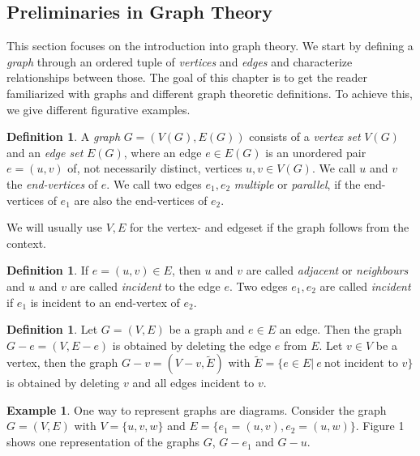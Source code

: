 \documentclass[12pt,a4paper, twoside, autooneside=false]{scrartcl}
\theoremstyle{definition}
\newtheorem{definition}[theorem]{Definition}
\newtheorem{beispiel}[theorem]{Example}
\theoremstyle{remark}
\numberwithin{equation}{section}
\begin{document}
\subsection{Preliminaries in Graph Theory} 
This section focuses on the introduction into graph theory. We start by defining a \textit{graph} through an ordered tuple of \textit{vertices} and \textit{edges} and characterize relationships between those. The goal of this chapter is to get the reader familiarized with graphs and different graph theoretic definitions. To achieve this, we give different figurative examples.
\begin{definition}
A \textit{graph} $G = (V(G), E(G))$ consists of a \textit{vertex set} $V(G)$ and an \textit{edge set} $E(G)$, where an edge $e \in E(G)$ is an unordered pair $e = (u,v)$ of, not necessarily distinct, vertices $u,v \in V(G)$. We call $u$ and $v$ the \textit{end-vertices} of $e$. We call two edges $e_1, e_2$ \textit{multiple} or \textit{parallel}, if the end-vertices of $e_1$ are also the end-vertices of $e_2$.
\end{definition}
We will usually use $V,E$ for the vertex- and edgeset if the graph follows from the context.
\begin{definition} If $e = (u,v) \in E$, then $u$ and $v$ are called \textit{adjacent} or \textit{neighbours} and $u$ and $v$ are called \textit{incident} to the edge $e$. Two edges $e_1,e_2$ are called \textit{incident} if $e_1$ is incident to an end-vertex of $e_2$.
\end{definition}
\begin{definition}
Let $G = (V,E)$ be a graph and $e \in E$ an edge. Then the graph $G - e = (V, E - e)$ is obtained by deleting the edge $e$ from $E$. Let $v \in V$ be a vertex, then the graph $G - v = (V - v, \tilde{E})$ with $\tilde{E} = \{e \in E | \ e \  \text{not incident to } v\}$ is obtained by deleting $v$ and all edges incident to $v$. 
\end{definition}
\begin{beispiel}
One way to represent graphs are diagrams. Consider the graph $G = (V,E)$ with $V = \{u,v,w\}$ and $E = \{e_1 = (u,v), e_2 = (u,w)\}$. Figure 1 shows one representation of the graphs $G$, $G - e_1$ and $G - u$. 
\begin{center}
\label{fig:label}
\end{center}
\end{beispiel}
\end{document}
